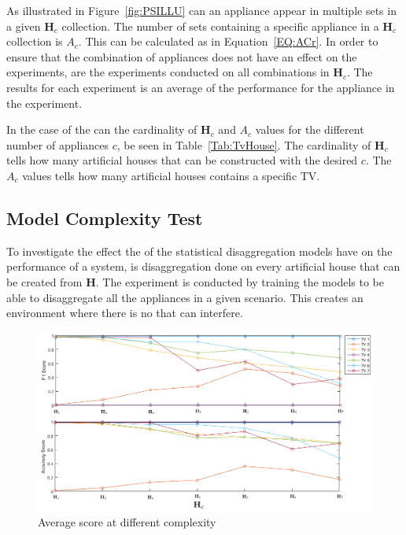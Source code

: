 As illustrated in Figure~\ref{fig:PSILLU} can an appliance appear in multiple sets in a given $\textbf{H}_c$ collection. The number of sets containing a specific appliance in a $\textbf{H}_c$ collection is $A_c$. This can be calculated as in Equation~\ref{EQ:ACr}. In order to ensure that the combination of appliances does not have an effect on the experiments, are the experiments conducted on all combinations in $\textbf{H}_c$. The results for each experiment is an average of the performance for the appliance in the experiment. 



In the case of the  can the cardinality of $\textbf{H}_c$ and $A_c$ values for the different number of appliances $c$, be seen in Table~\ref{Tab:TvHouse}. The cardinality of $\textbf{H}_c$ tells how many artificial houses that can be constructed with the desired  $c$. The $A_c$ values tells how many artificial houses contains a specific TV.


\subsection{Model Complexity Test}
\label{sec:MCT}
To investigate the effect the  of the statistical disaggregation models have on the performance of a  system, is disaggregation done on every artificial house that can be created from $\textbf{H}$. The experiment is conducted by training the models to be able to disaggregate all the appliances in a given scenario. This creates an environment where there is no  that can interfere.

\begin{figure}[H]
\centering
\includegraphics[width=1\textwidth]{billeder/ModelSize.png}
\caption{Average score at different complexity }
\label{fig:COMPT}
\end{figure}

